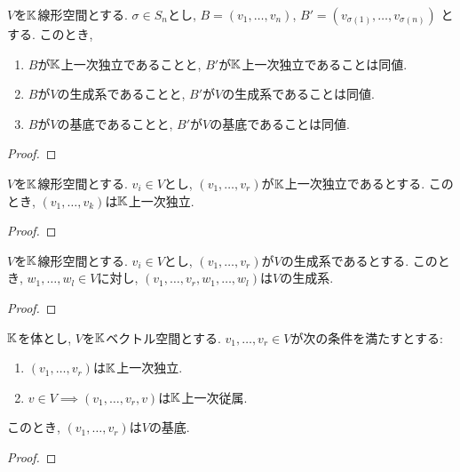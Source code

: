 \begin{prop}
  $V$を$\mathbb{K}$線形空間とする.
  $\sigma\in S_n$とし,
  $B=(v_1,\ldots,v_n)$,
  $B'=(v_{\sigma(1)},\ldots,v_{\sigma(n)})$
  とする.
  このとき,
  \begin{enumerate}
  \item $B$が$\mathbb{K}$上一次独立であることと, $B'$が$\mathbb{K}$上一次独立であることは同値.
  \item $B$が$V$の生成系であることと,  $B'$が$V$の生成系であることは同値.
  \item $B$が$V$の基底であることと,  $B'$が$V$の基底であることは同値.  
  \end{enumerate}
\end{prop}
\begin{proof}\end{proof}

\begin{prop}
  $V$を$\mathbb{K}$線形空間とする.
  $v_i\in V$とし,
  $(v_1,\ldots, v_r)$が$\mathbb{K}$上一次独立であるとする.
  このとき,
  $(v_{1},\ldots, v_{k})$は$\mathbb{K}$上一次独立.
\end{prop}
\begin{proof}\end{proof}
\begin{prop}
  $V$を$\mathbb{K}$線形空間とする.
  $v_i\in V$とし,
  $(v_1,\ldots, v_r)$が$V$の生成系であるとする.
  このとき,
  $w_1,\ldots,w_l\in V$に対し,
  $(v_{1},\ldots, v_{r},w_1,\ldots,w_l)$は$V$の生成系.
\end{prop}
\begin{proof}\end{proof}

\begin{prop}
  $\mathbb{K}$を体とし,
  $V$を$\mathbb{K}$ベクトル空間とする.
  $v_1,\ldots, v_r\in V$が次の条件を満たすとする:
  \begin{enumerate}
  \item $(v_1,\ldots, v_r)$は$\mathbb{K}$上一次独立.
  \item $v\in V\implies (v_1,\ldots, v_r,v)$は$\mathbb{K}$上一次従属.
  \end{enumerate}
  このとき,
  $(v_1,\ldots, v_r)$は$V$の基底.
\end{prop}
\begin{proof}\end{proof}



